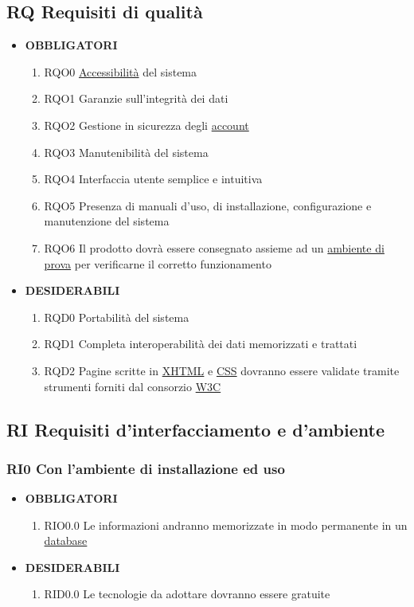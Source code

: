 \documentclass[11pt,a4paper]{article}
\begin{document}
\subsection{RQ Requisiti di qualità}
\begin{itemize}
\item \textbf{OBBLIGATORI}
\begin{enumerate}
\item RQO0 \underline{Accessibilità} del sistema
\item RQO1 Garanzie sull'integrità dei dati
\item RQO2 Gestione in sicurezza degli \underline{account}
\item RQO3 Manutenibilità del sistema
\item RQO4 Interfaccia utente semplice e intuitiva
\item RQO5 Presenza di manuali d'uso, di installazione, configurazione e manutenzione del sistema
\item RQO6 Il prodotto dovrà essere consegnato assieme ad un \underline{ambiente di prova} per verificarne il corretto funzionamento
\end{enumerate}
\item \textbf{DESIDERABILI}
\begin{enumerate}
\item RQD0 Portabilità del sistema
\item RQD1 Completa interoperabilità dei dati memorizzati e trattati
\item RQD2 Pagine scritte in \underline{XHTML} e \underline{CSS} dovranno essere validate tramite strumenti forniti dal consorzio \underline{W3C}
\end{enumerate}
\end{itemize}
\subsection{RI Requisiti d'interfacciamento e d'ambiente}
\subsubsection{RI0 Con l’ambiente di installazione ed uso}
\begin{itemize}
\item \textbf{OBBLIGATORI}
\begin{enumerate}
\item RIO0.0 Le informazioni andranno memorizzate in modo permanente in un \underline{database}
\end{enumerate}
\item \textbf{DESIDERABILI}
\begin{enumerate}
\item RID0.0 Le tecnologie da adottare dovranno essere gratuite
\end{enumerate}
\end{itemize}
\end{document}
